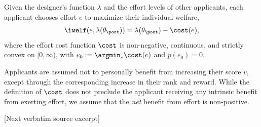 \documentclass[10pt]{article}
\begin{document}
\begin{ReviewVerbatim}
 Given the designer's function $\lambda$ and the effort levels of other applicants, each applicant chooses effort $e$ to maximize their individual welfare, %
\begin{equation*}
	\iwelf(e, \lambda(\theta_\post)) = \lambda(\theta_\post) - \cost(e),
\end{equation*}
where the effort cost function $\cost$ is non-negative, continuous, and strictly convex {on $[0,\infty)$, with $e_0:=\argmin_e \cost(e)$ and $p(e_0) = 0$.}

Applicants are assumed not to personally benefit from increasing their score $v$, except through the corresponding increase in their rank and reward. While the definition of $\cost$ does not preclude the applicant receiving any intrinsic benefit from exerting effort, we assume that the \emph{net} benefit from effort is non-positive.

[Next verbatim source excerpt]


\end{ReviewVerbatim}
\end{document}
